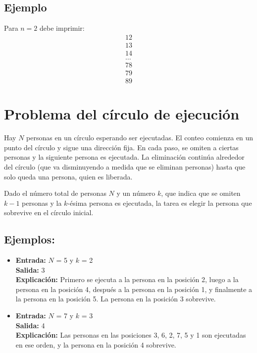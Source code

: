 \subsection*{Ejemplo}
Para \( n = 2 \) debe imprimir:  
\begin{equation}
    \begin{aligned}  
    12 \\ 
    13 \\ 
    14 \\ 
    \ldots \\ 
    78 \\
    79 \\
    89  
    \end{aligned}
\end{equation}



\section{Problema del círculo de ejecución}  
Hay $N$ personas en un círculo esperando ser ejecutadas. El conteo comienza en un punto del círculo y sigue una dirección fija. En cada paso, se omiten a ciertas personas y la siguiente persona es ejecutada. La eliminación continúa alrededor del círculo (que va disminuyendo a medida que se eliminan personas) hasta que solo queda una persona, quien es liberada.

Dado el número total de personas $N$ y un número $k$, que indica que se omiten $k-1$ personas y la $k$-ésima persona es ejecutada, la tarea es elegir la persona que sobrevive en el círculo inicial.

\subsection*{Ejemplos:}
\begin{itemize}
    \item \textbf{Entrada:} $N$ = 5 y $k$ = 2\\
        \textbf{Salida:} 3\\
        \textbf{Explicación:} Primero se ejecuta a la persona en la posición 2, luego a la persona en la posición 4, después a la persona en la posición 1, y finalmente a la persona en la posición 5. La persona en la posición 3 sobrevive.
    \item \textbf{Entrada:} $N$ = 7 y $k$ = 3\\
        \textbf{Salida:} 4\\
        \textbf{Explicación:} Las personas en las posiciones 3, 6, 2, 7, 5 y 1 son ejecutadas en ese orden, y la persona en la posición 4 sobrevive.
\end{itemize}

